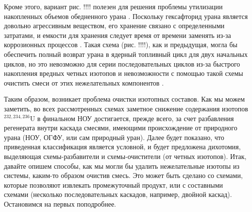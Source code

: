 Кроме этого, вариант рис. !!!! полезен для решения проблемы утилизации накопленных объемов обедненного урана \cite{smirnovEnrichmentRegeneratedUranium2014}. Поскольку гексафторид урана является довольно агрессивным веществом, его хранение связано с определенными затратами, и емкости для хранения следует время от времени заменять из-за коррозионных процессов \cite{fitchOPTIONSDISPOSALREAPPLICATION2009, oecdManagementDepletedUranium2001}.
Такая схема (рис. !!!!), как и предыдущая, могла бы обеспечить полный возврат урана в ядерный топливный цикл для двух начальных циклов, но это невозможно для серии последовательных циклов из-за быстрого накопления вредных четных изотопов и невозможности с помощью такой схемы очистить смеси от этих нежелательных компонентов \cite{smirnovApplyingEnrichmentCapacities2018}.

Таким образом, возникает проблема очистки изотопных составов.
Как мы можем заметить, во всех рассмотренных схемах заметное снижение содержания изотопов $^{232,234,236}$U в финальном НОУ достигается, прежде всего, за счет разбавления регенерата внутри каскада смесями, имеющими происхождение от природного урана (НОУ, ОГФУ, или сам природный уран). Далее будет показано, что приведенная классификация является условной, и будет предложена дихотомия, выделяющая схемы-разбавители и схемы-очистители (от четных изотопов). Итак, давайте опишем способы, как мы могли бы удалить нежелательные изотопы из системы, каким-то образом очистив смесь. Это может быть сделано со схемами, которые позволяют извлекать промежуточный продукт, или с составными схемами (несколько последовательных каскадов, например, двойной каскад). Остановимся на первых поподробнее.

